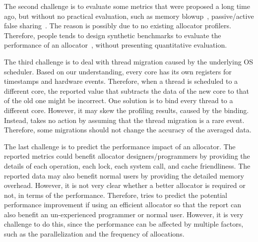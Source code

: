 The second challenge is to evaluate some metrics that were proposed a long time ago, but without no practical evaluation, such as memory blowup~\cite{Hoard}, passive/active false sharing~\cite{Hoard}. The reason is possibly due to no existing allocator profilers. Therefore, people tends to design  synthetic benchmarks to evaluate the performance of an allocator~\cite{Hoard, Scalloc}, without presenting quantitative evaluation. 



The third challenge is to deal with thread migration caused by the underlying OS scheduler. Based on our understanding, every core has its own registers for timestamps and hardware events. Therefore, when a thread is scheduled to a different core, the reported value that subtracts the data of the new core to that of the old one might be incorrect. One solution is to bind every thread to a different core. However, it may  skew the profiling results, caused by the binding. Instead, \MP{} takes no action by assuming that the thread migration is a rare event. Therefore, some migrations should not change the accuracy of the averaged data. 


The last challenge is to predict the performance impact of an allocator. The reported metrics could benefit allocator designers/programmers by providing the details of each operation, each lock, each system call, and cache friendliness. The reported data may also benefit normal users by providing the detailed memory overhead. However, it is not very clear whether a better allocator is required or not, in terms of the performance. Therefore, \MP{} tries to predict the potential performance improvement if using an efficient allocator so that the report can also benefit an un-experienced programmer or normal user. However, it is very challenge to do this, since the performance can be affected by multiple factors, such as the parallelization and the frequency of allocations.    

 




